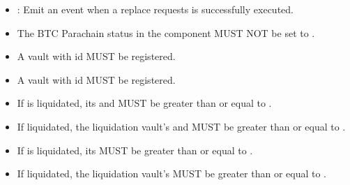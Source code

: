 \documentclass[a4paper,10pt,english]{sphinxmanual}
\begin{document}
\begin{itemize}
\item {} 
: Emit an event when a replace requests is successfully executed.

\end{itemize}

\begin{itemize}
\item {} 
The BTC Parachain status in the {\hyperref[\detokenize{spec/security:security}]{}} component MUST NOT be set to .

\item {} 
A vault with id  MUST be registered.

\item {} 
A vault with id  MUST be registered.

\item {} 
If  is  liquidated, its  and  MUST be greater than or equal to .

\item {} 
If   liquidated, the liquidation vault’s  and  MUST be greater than or equal to .

\item {} 
If  is  liquidated, its  MUST be greater than or equal to .

\item {} 
If   liquidated, the liquidation vault’s  MUST be greater than or equal to .

\end{itemize}
\end{document}
